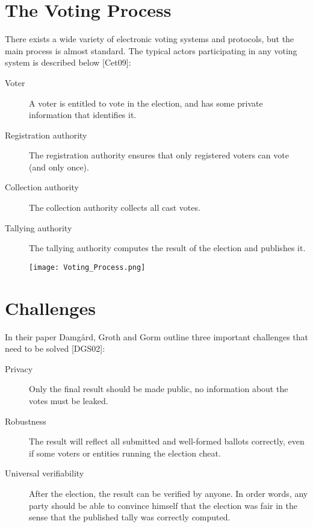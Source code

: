 \section{The Voting Process}

There exists a wide variety of electronic voting systems and protocols, but
the main process is almost standard. The typical actors participating in any
voting system is described below [Cet09]:

\begin{description}
    \item[Voter] A voter is entitled to vote in the election, and has some private
        information that identifies it.

    \item[Registration authority] The registration authority ensures that only
        registered voters can vote (and only once).
        
    \item[Collection authority] The collection authority collects all cast votes.

    \item[Tallying authority] The tallying authority computes the result of the
        election and publishes it.   
\end{description}



\begin{figure}[H]
\texttt{[image: Voting\_Process.png]}
\centering
\end{figure}


\section{Challenges}


In their paper Damgård, Groth and Gorm outline three important challenges
that need to be solved [DGS02]:

\begin{description}
    \item[Privacy] Only the final result should be made public, no information
        about the votes must be leaked.

    \item[Robustness] The result will reflect all submitted and well-formed ballots
        correctly, even if some voters or entities running the election cheat.

    \item[Universal verifiability] After the election, the result can be verified by
        anyone. In order words, any party should be able to convince himself
        that the election was fair in the sense that the published tally was
        correctly computed.
\end{description}


